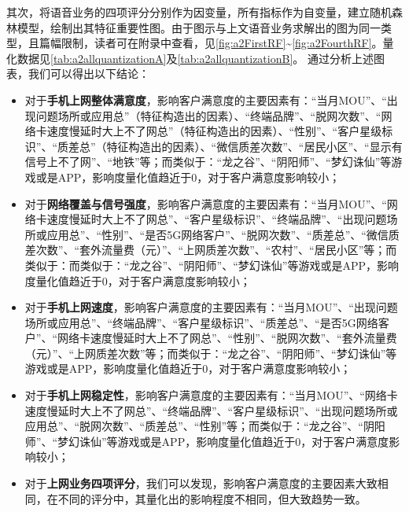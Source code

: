 \documentclass{MathorCupmodeling}
\begin{document}
	其次，将语音业务的四项评分分别作为因变量，所有指标作为自变量，建立随机森林模型，绘制出其特征重要性图。由于图示与上文语音业务求解出的图为同一类型，且篇幅限制，读者可在附录中查看，见\textcolor{blue}{\cref{fig:a2FirstRF}}\textasciitilde\textcolor{blue}{\cref{fig:a2FourthRF}}。量化数据见\textcolor{blue}{\cref{tab:a2allquantizationA}}及\textcolor{blue}{\cref{tab:a2allquantizationB}}。
	通过分析上述图表，我们可以得出以下结论：
	\begin{itemize}
		\item 对于\textbf{手机上网整体满意度}，影响客户满意度的主要因素有：“当月MOU”、“出现问题场所或应用总”（特征构造出的因素）、“终端品牌”、“脱网次数”、“网络卡速度慢延时大上不了网总”（特征构造出的因素）、“性别”、“客户星级标识”、“质差总”（特征构造出的因素）、“微信质差次数”、“居民小区”、“显示有信号上不了网”、“地铁”等；而类似于：“龙之谷”、“阴阳师”、“梦幻诛仙”等游戏或是APP，影响度量化值趋近于0，对于客户满意度影响较小；
		\item 对于\textbf{网络覆盖与信号强度}，影响客户满意度的主要因素有：“当月MOU”、“网络卡速度慢延时大上不了网总”、“客户星级标识”、“终端品牌”、“出现问题场所或应用总”、“性别”、“是否5G网络客户”、“脱网次数”、“质差总”、“微信质差次数”、“套外流量费（元）”、“上网质差次数”、“农村”、“居民小区”等；而类似于：而类似于：“龙之谷”、“阴阳师”、“梦幻诛仙”等游戏或是APP，影响度量化值趋近于0，对于客户满意度影响较小；
		\item 对于\textbf{手机上网速度}，影响客户满意度的主要因素有：“当月MOU”、“出现问题场所或应用总”、“终端品牌”、“客户星级标识”、“质差总”、“是否5G网络客户”、“网络卡速度慢延时大上不了网总”、“性别”、“脱网次数”、“套外流量费（元）”、“上网质差次数”等；而类似于：“龙之谷”、“阴阳师”、“梦幻诛仙”等游戏或是APP，影响度量化值趋近于0，对于客户满意度影响较小；
		\item 对于\textbf{手机上网稳定性}，影响客户满意度的主要因素有：“当月MOU”、“网络卡速度慢延时大上不了网总”、“终端品牌”、“客户星级标识”、“出现问题场所或应用总”、“脱网次数”、“质差总”、“性别”等；而类似于：“龙之谷”、“阴阳师”、“梦幻诛仙”等游戏或是APP，影响度量化值趋近于0，对于客户满意度影响较小；
		\item 对于\textbf{上网业务四项评分}，我们可以发现，影响客户满意度的主要因素大致相同，在不同的评分中，其量化出的影响程度不相同，但大致趋势一致。
	\end{itemize}
\end{document}
